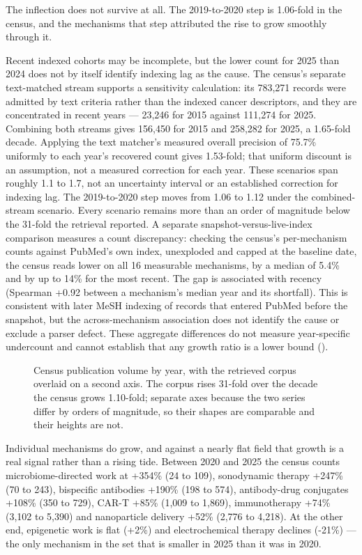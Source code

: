 \documentclass[11pt,twoside,openright]{report}
\begin{document}
The inflection does not survive at all. The 2019-to-2020 step is 1.06-fold in the census, and the mechanisms that step attributed the rise to grow smoothly through it.

Recent indexed cohorts may be incomplete, but the lower count for 2025 than 2024 does not by itself identify indexing lag as the cause. The census's separate text-matched stream supports a sensitivity calculation: its 783,271 records were admitted by text criteria rather than the indexed cancer descriptors, and they are concentrated in recent years --- 23,246 for 2015 against 111,274 for 2025. Combining both streams gives 156,450 for 2015 and 258,282 for 2025, a 1.65-fold decade. Applying the text matcher's measured overall precision of 75.7\% uniformly to each year's recovered count gives 1.53-fold; that uniform discount is an assumption, not a measured correction for each year. These scenarios span roughly 1.1 to 1.7, not an uncertainty interval or an established correction for indexing lag. The 2019-to-2020 step moves from 1.06 to 1.12 under the combined-stream scenario. Every scenario remains more than an order of magnitude below the 31-fold the retrieval reported. A separate snapshot-versus-live-index comparison measures a count discrepancy: checking the census's per-mechanism counts against PubMed's own index, unexploded and capped at the baseline date, the census reads lower on all 16 measurable mechanisms, by a median of 5.4\% and by up to 14\% for the most recent. The gap is associated with recency (Spearman +0.92 between a mechanism's median year and its shortfall). This is consistent with later MeSH indexing of records that entered PubMed before the snapshot, but the across-mechanism association does not identify the cause or exclude a parser defect. These aggregate differences do not measure year-specific undercount and cannot establish that any growth ratio is a lower bound ().

\begin{figure}[tbp]
\setcounter{figure}{1}
\caption{Census publication volume by year, with the retrieved corpus overlaid on a second axis. The corpus rises 31-fold over the decade the census grows 1.10-fold; separate axes because the two series differ by orders of magnitude, so their shapes are comparable and their heights are not.}
\label{fig:fig2c_census_volume}
\end{figure}

Individual mechanisms do grow, and against a nearly flat field that growth is a real signal rather than a rising tide. Between 2020 and 2025 the census counts microbiome-directed work at +354\% (24 to 109), sonodynamic therapy +247\% (70 to 243), bispecific antibodies +190\% (198 to 574), antibody-drug conjugates +108\% (350 to 729), CAR-T +85\% (1,009 to 1,869), immunotherapy +74\% (3,102 to 5,390) and nanoparticle delivery +52\% (2,776 to 4,218). At the other end, epigenetic work is flat (+2\%) and electrochemical therapy declines (-21\%) --- the only mechanism in the set that is smaller in 2025 than it was in 2020.
\end{document}
